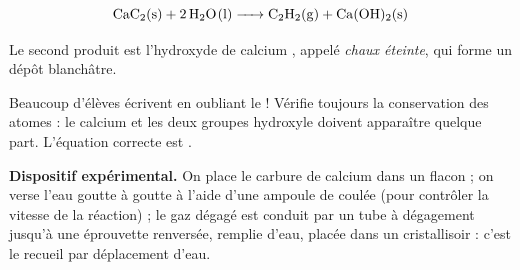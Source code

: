 \documentclass[11pt]{article}
\newcommand{\cle}[1]{{\popxbold\color{popdark}#1}}
\begin{document}
\[ \ce{CaC2(s) + 2 H2O(l) -> C2H2(g) + Ca(OH)2(s)} \]

Le second produit est l'\cle{hydroxyde de calcium} , appelé \emph{chaux éteinte}, qui forme un dépôt blanchâtre.

\begin{attention}
Beaucoup d'élèves écrivent  en oubliant le  ! Vérifie toujours la conservation des atomes : le calcium et les deux groupes hydroxyle doivent apparaître quelque part. L'équation correcte est .
\end{attention}

\textbf{Dispositif expérimental.} On place le carbure de calcium dans un flacon ; on verse l'eau goutte à goutte à l'aide d'une ampoule de coulée (pour contrôler la vitesse de la réaction) ; le gaz dégagé est conduit par un tube à dégagement jusqu'à une éprouvette renversée, remplie d'eau, placée dans un cristallisoir : c'est le \cle{recueil par déplacement d'eau}.
\end{document}
